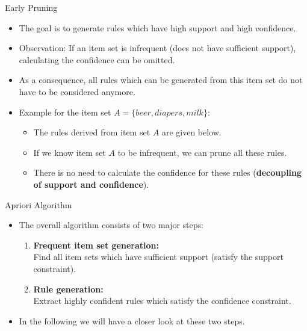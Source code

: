 \begin{dwHeaderFrame}{Early Pruning}
	\begin{itemize}
		\item The goal is to generate rules which have high support and high confidence.
		\item Observation: If an item set is infrequent (does not have sufficient support), calculating the confidence can be omitted.
		\item As a consequence, all rules which can be generated from this item set do not have to be considered anymore.
		\item Example for the item set $A = \{ beer, diapers, milk \}$:
		\begin{itemize}
			\item The rules derived from item set $A$ are given below.
			\item If we know item set $A$ to be infrequent, we can prune all these rules.
			\item There is no need to calculate the confidence for these rules (\textbf{decoupling of support and confidence}).
		\end{itemize}
	\end{itemize}
\end{dwHeaderFrame}


\begin{dwHeaderFrame}{Apriori Algorithm}
	\begin{itemize}
		\item The overall algorithm consists of two major steps:
		\begin{enumerate}
			\item \textbf{Frequent item set generation:} \\
				Find all item sets which have sufficient support (satisfy the support constraint).
			\item \textbf{Rule generation:} \\
				Extract highly confident rules which satisfy the confidence constraint.
		\end{enumerate}
		\item In the following we will have a closer look at these two steps.
	\end{itemize}
\end{dwHeaderFrame}


